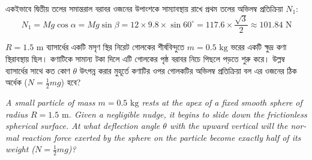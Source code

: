\documentclass[12pt, a4paper]{article}
\begin{document}
{{\begin{tcolorbox}[solutionbox={সমাধান (Solution)}]
    একইভাবে দ্বিতীয় তলের সমান্তরাল বরাবর ওজনের উপাংশকে সাম্যাবস্থায় রাখে প্রথম তলের অভিলম্ব প্রতিক্রিয়া $N_1$:
    \[ N_1 = M g \cos\alpha = M g \sin\beta = 12 \times 9.8 \times \sin 60^\circ = 117.6 \times \frac{\sqrt{3}}{2} \approx \mathbf{101.84}\text{ N} \]
\end{tcolorbox}

\newpage

\begin{tcolorbox}[questionbox={প্রশ্ন (Question) 28}]
    \noindent
    $R = 1.5\text{ m}$ ব্যাসার্ধের একটি মসৃণ স্থির নিরেট গোলকের শীর্ষবিন্দুতে $m = 0.5\text{ kg}$ ভরের একটি ক্ষুদ্র কণা স্থিরাবস্থায় ছিল। কণাটিকে সামান্য টকা দিলে এটি গোলকের পৃষ্ঠ বরাবর নিচে পিছলে পড়তে শুরু করে। উল্লম্ব ব্যাসার্ধের সাথে কত কোণ $\theta$ উৎপন্ন করার মুহূর্তে কণাটির ওপর গোলকটির অভিলম্ব প্রতিক্রিয়া বল এর ওজনের ঠিক অর্ধেক ($N = \frac{1}{2} mg$) হবে?
    
    \vspace{0.8em}
    \begin{english}
    \noindent\textit{\color{darkgray}
    A small particle of mass $m = 0.5\text{ kg}$ rests at the apex of a fixed smooth sphere of radius $R = 1.5\text{ m}$. Given a negligible nudge, it begins to slide down the frictionless spherical surface. At what deflection angle $\theta$ with the upward vertical will the normal reaction force exerted by the sphere on the particle become exactly half of its weight ($N = \frac{1}{2} mg$)?
    }
    \end{english}
\end{tcolorbox}

\vspace{1em}
\begin{center}
\end{center}
\vspace{1em}

}}
\end{document}
